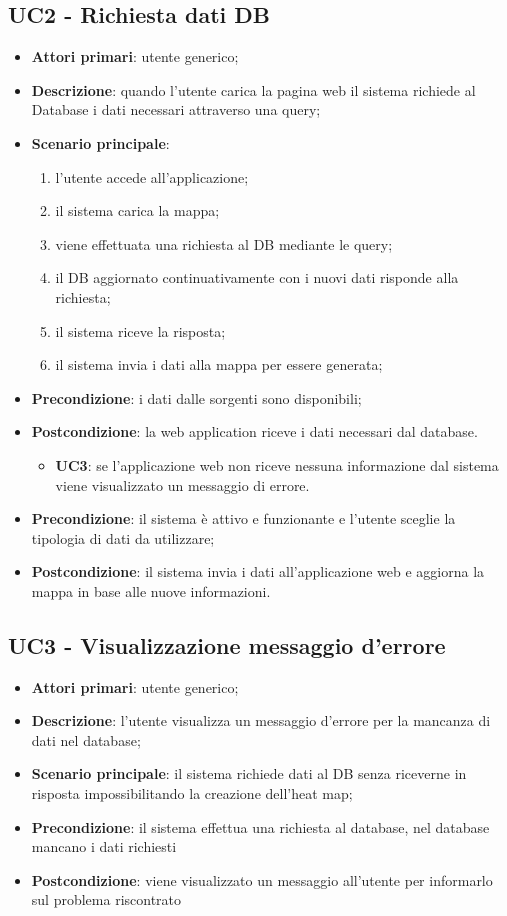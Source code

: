 \subsection{UC2 - Richiesta dati DB}
\begin{itemize}
	\item \textbf{Attori primari}: utente generico;
	\item \textbf{Descrizione}: quando l’utente carica la pagina web il sistema richiede al Database i dati necessari attraverso una query;
	\item \textbf{Scenario principale}: 
		\begin{enumerate}
			\item l’utente accede all’applicazione;
			\item il sistema carica la mappa;
			\item viene effettuata una richiesta al DB mediante le query;
			\item il DB aggiornato continuativamente con i nuovi dati risponde alla richiesta;
			\item il sistema riceve la risposta;
			\item il sistema invia i dati alla mappa per essere generata;
		\end{enumerate}
	\item \textbf{Precondizione}: i dati dalle sorgenti sono disponibili;
	\item \textbf{Postcondizione}: la web application riceve i dati necessari dal database. 
	\begin{itemize}
		\item \textbf{UC3}: se l'applicazione web non riceve nessuna informazione dal sistema viene visualizzato un messaggio di errore.
	\end{itemize}
	\item \textbf{Precondizione}: il sistema è attivo e funzionante e l'utente sceglie la tipologia di dati da utilizzare;
	\item \textbf{Postcondizione}: il sistema invia i dati all'applicazione web e aggiorna la mappa in base alle nuove informazioni.
\end{itemize}

\subsection{UC3 - Visualizzazione messaggio d’errore}
\begin{itemize}
	\item \textbf{Attori primari}: utente generico;
	\item \textbf{Descrizione}: l’utente visualizza un messaggio d’errore per la mancanza di dati nel database;
	\item \textbf{Scenario principale}: il sistema richiede dati al DB senza riceverne in risposta impossibilitando la creazione dell’heat map;
	\item \textbf{Precondizione}: il sistema effettua una richiesta al database, nel database mancano i dati richiesti
	\item \textbf{Postcondizione}: viene visualizzato un messaggio all’utente per informarlo sul problema riscontrato
\end{itemize}

